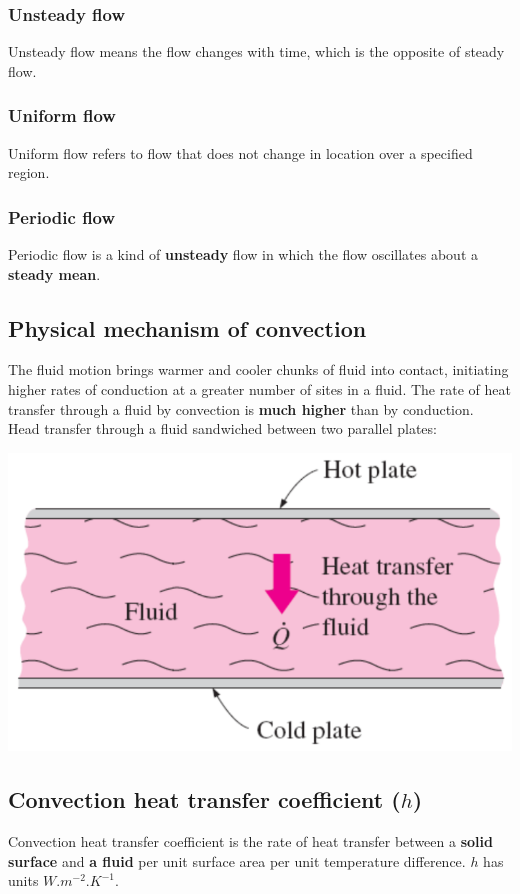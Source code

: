 \documentclass[11pt]{article}
\begin{document}
\subsubsection{Unsteady flow}
\label{sec:org91d77ae}
Unsteady flow means the flow changes with time, which is the opposite of steady flow.
\subsubsection{Uniform flow}
\label{sec:org1033a66}
Uniform flow refers to flow that does not change in location over a specified region.
\subsubsection{Periodic flow}
\label{sec:org2e4998f}
Periodic flow is a kind of \textbf{unsteady} flow in which the flow oscillates about a \textbf{steady mean}.

 \newpage
\subsection{Physical mechanism of convection}
\label{sec:org1bd469f}
The fluid motion brings warmer and cooler chunks of fluid into contact, initiating higher rates of conduction at a greater number of sites in a fluid. The rate of heat transfer through a fluid by convection is \textbf{much higher} than by conduction.  \\

Head transfer through a fluid sandwiched between two parallel plates:
\begin{center}
\includegraphics[width=.9\linewidth]{./images/internal-flow-diagram.png}
\end{center}
\subsection{Convection heat transfer coefficient (\(h\))}
\label{sec:org61338e2}
Convection heat transfer coefficient is the rate of heat transfer between a \textbf{solid surface} and \textbf{a fluid} per unit surface area per unit temperature difference. \(h\) has units \(\unit{W.m^{-2}.K^{-1}}\).
\end{document}

